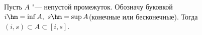 Пусть $A$ "--- непустой промежуток. Обозначу буковкой $i\hm=\inf A,\ s\hm=\sup A$(конечные или бесконечные). 
Тогда $(i,s)\subset A\subset[i,s]$.
